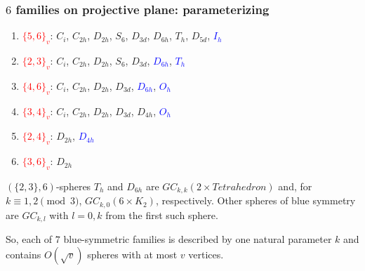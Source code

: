 \documentclass{beamer}
\begin{document}
\begin{frame}\frametitle{$6$ families on projective plane: parameterizing}
\begin{enumerate}
\item
\textcolor{red}{$\{5,6\}_v$}:
$C_i$, $C_{2h}$, $D_{2h}$, $S_6$, $D_{3d}$, $D_{6h}$,  $T_h$, $D_{5d}$, 
\textcolor{blue}{$I_h$}
\item
\textcolor{red}{$\{2, 3\}_v$}:  $C_i$, $C_{2h}$,
  $D_{2h}$, $S_6$, $D_{3d}$, \textcolor{blue}{$D_{6h}$},   \textcolor{blue}{$T_h$}
\item
\textcolor{red}{$\{4,6\}_v$}:
$C_{i}$, $C_{2h}$, $D_{2h}$, $D_{3d}$, \textcolor{blue}{$D_{6h}$}, \textcolor{blue}{$O_h$}
\item
\textcolor{red}{$\{3, 4\}_v$}:
$C_i$, $C_{2h}$, $D_{2h}$, $D_{3d}$, $D_{4h}$,  \textcolor{blue}{$O_h$}
\item
\textcolor{red}{$\{2, 4\}_v$}: $D_{2h}$, 
\textcolor{blue}{$D_{4h}$}
\item
\textcolor{red}{$\{3,6\}_v$}: $D_{2h}$

\end{enumerate}
\vspace{2mm}\pause
$(\{2, 3\},6)$-spheres $T_h$ and $D_{6h}$   are  
$GC_{k,k}(2\times Tetrahedron)$ and, for $k\equiv 1,2 \pmod 3$,  
$GC_{k,0}(6\times K_2)$, respectively.
Other spheres of blue symmetry are  $GC_{k,l}$ with $l=0,k$ from the first 
such sphere. 
\vspace{1mm}

So, each of $7$ blue-symmetric  families 
is described by one natural parameter $k$
and contains $O(\sqrt{v})$ spheres with at most $v$ vertices.


\end{frame}
\end{document}
